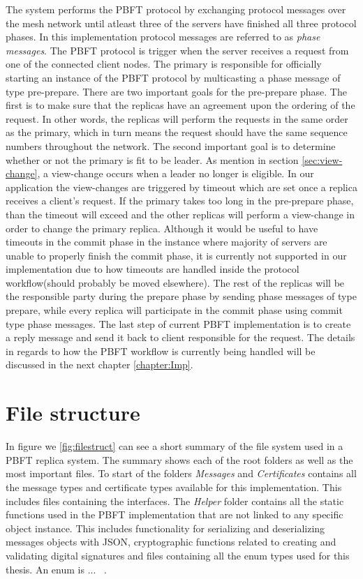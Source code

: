 The system performs the PBFT protocol by exchanging protocol messages over the mesh network until atleast three of the servers have finished all three protocol phases. In this implementation protocol messages are referred to as \emph{phase messages}. The PBFT protocol is trigger when the server receives a request from one of the connected client nodes. The primary is responsible for officially starting an instance of the PBFT protocol by multicasting a phase message of type pre-prepare. There are two important goals for the pre-prepare phase. The first is to make sure that the replicas have an agreement upon the ordering of the request. In other words, the replicas will perform the requests in the same order as the primary, which in turn means the request should have the same sequence numbers throughout the network. The second important goal is to determine whether or not the primary is fit to be leader. As mention in section \autoref{sec:view-change}, a view-change occurs when a leader no longer is eligible. In our application the view-changes are triggered by timeout which are set once a replica receives a client's request. If the primary takes too long in the pre-prepare phase, than the timeout will exceed and the other replicas will perform a view-change in order to change the primary replica. Although it would be useful to have timeouts in the commit phase in the instance where majority of servers are unable to properly finish the commit phase, it is currently not supported in our implementation due to how timeouts are handled inside the protocol workflow(should probably be moved elsewhere). The rest of the replicas will be the responsible party during the prepare phase by sending phase messages of type prepare, while every replica will participate in the commit phase using commit type phase messages. The last step of current PBFT implementation is to create a reply message and send it back to client responsible for the request. The details in regards to how the PBFT workflow is currently being handled will be discussed in the next chapter \autoref{chapter:Imp}.

\section{File structure}
In figure we \autoref{fig:filestruct} can see a short summary of the file system used in a PBFT replica system. The summary shows each of the root folders as well as the most important files. To start of the folders \emph{Messages} and \emph{Certificates} contains all the message types and certificate types available for this implementation. This includes files containing the interfaces. The \emph{Helper} folder contains all the static functions used in the PBFT implementation that are not linked to any specific object instance. This includes functionality for serializing and deserializing messages objects with JSON, cryptographic functions related to creating and validating digital signatures and files containing all the enum types used for this thesis. An enum is ... ~\cite{WEB:Enum}.

